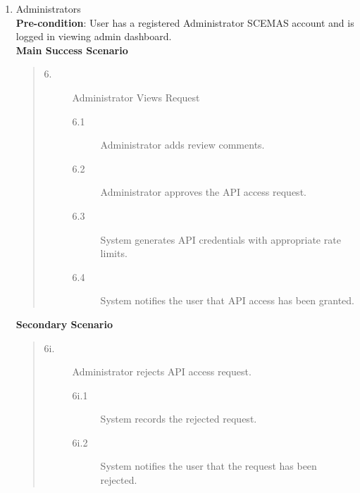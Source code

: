 \documentclass[]{article}
\begin{document}
\begin{enumerate}[{\bf BE7.}]
\begin{enumerate}[{\bf VP1.}]
            \item Administrators \\
                \textbf{Pre-condition}: User has a registered Administrator SCEMAS account and is logged in viewing admin dashboard.\\
                \textbf{Main Success Scenario}
                \begin{quote}
                    \begin{description}
                        \item[\textmd{6.}] Administrator Views Request
                        \begin{description}
                            \item[\textmd{6.1}] Administrator adds review comments.
                            \item[\textmd{6.2}] Administrator approves the API access request.
                            \item[\textmd{6.3}] System generates API credentials with appropriate rate limits.
                            \item[\textmd{6.4}] System notifies the user that API access has been granted.
                        \end{description}
                    \end{description}
                \end{quote}

                \textbf{Secondary Scenario}
                \begin{quote}
                    \begin{description}
                        \item[\textmd{6i.}] Administrator rejects API access request.
                        \begin{description}
                            \item[\textmd{6i.1}] System records the rejected request.
                            \item[\textmd{6i.2}] System notifies the user that the request has been rejected.
                        \end{description}
                    \end{description}
                \end{quote}


\end{enumerate}
\end{enumerate}
\end{document}

